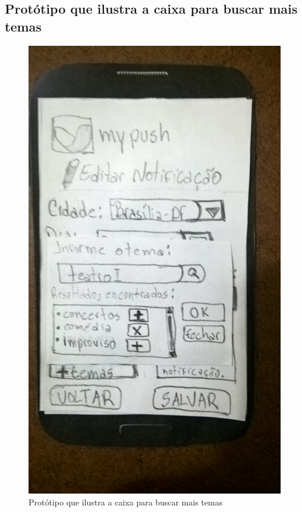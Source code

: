 \begin{anexosenv}
  \pagebreak
  \section*{Protótipo que ilustra a caixa para buscar mais temas}

    \begin{figure}[!htbp]
      \centering
      \includegraphics[scale=0.32, angle=-90]{editaveis/figuras/prototipo_papel_v2/editar_notificacao_mais_temas}
      \caption{Protótipo que ilustra a caixa para buscar mais temas}
      \label{editar_notificacao_mais_temas_v2}
    \end{figure}
  

\end{anexosenv}
